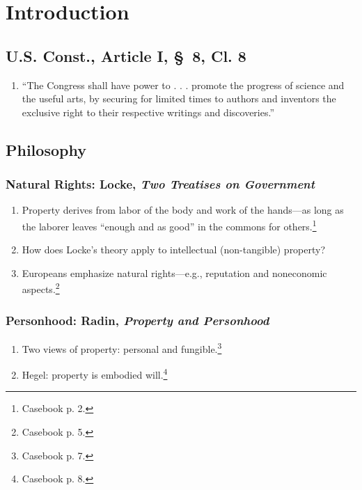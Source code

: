 \section{Introduction}

\subsection{U.S. Const., Article I, \S\ 8, Cl. 8}

\begin{enumerate}
    \item ``The Congress shall have power to . . . promote the progress of 
    science and the useful arts, by securing for limited times to authors and 
    inventors the exclusive right to their respective writings and 
    discoveries.''
\end{enumerate}

\subsection{Philosophy}

\subsubsection{Natural Rights: Locke, \emph{Two Treatises on Government}}

\begin{enumerate}
    \item Property derives from labor of the body and work of the hands---as 
    long as the laborer leaves ``enough and as good'' in the commons for 
    others.\footnote{Casebook p. 2.}
    \item How does Locke's theory apply to intellectual (non-tangible) 
    property?
    \item Europeans emphasize natural rights---e.g., reputation and 
    noneconomic aspects.\footnote{Casebook p. 5.}
\end{enumerate}

\subsubsection{Personhood: Radin, \emph{Property and Personhood}}

\begin{enumerate}
    \item Two views of property: personal and fungible.\footnote{Casebook p. 
    7.}
    \item Hegel: property is embodied will.\footnote{Casebook p. 8.}
\end{enumerate}

